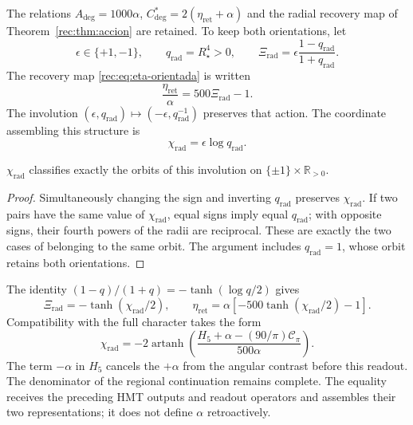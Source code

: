 The relations $A_{\deg}=1000\alpha$,
$C^*_{\deg}=2(\eta_{\mathrm{ret}}+\alpha)$ and the radial recovery map of
Theorem~\ref{rec:thm:accion} are retained. To keep both orientations, let
\begin{equation}
 \epsilon\in\{+1,-1\},\qquad
 q_{\mathrm{rad}}=R_\star^4>0,\qquad
 \Xi_{\mathrm{rad}}=
 \epsilon\frac{1-q_{\mathrm{rad}}}{1+q_{\mathrm{rad}}}.
 \label{md:restop:par-radial}
\end{equation}
The recovery map \eqref{rec:eq:eta-orientada} is written
\begin{equation}
 \frac{\eta_{\mathrm{ret}}}{\alpha}=500\Xi_{\mathrm{rad}}-1.
 \label{md:restop:recuperador}
\end{equation}
The involution
$(\epsilon,q_{\mathrm{rad}})
 \mapsto(-\epsilon,q_{\mathrm{rad}}^{-1})$
preserves that action. The coordinate assembling this structure is
\begin{equation}
 \boxed{\chi_{\mathrm{rad}}=\epsilon\log q_{\mathrm{rad}}.}
 \label{md:restop:chi}
\end{equation}

\begin{proposition}
\label{md:restop:proposicion-orbitas}
$\chi_{\mathrm{rad}}$ classifies exactly the orbits of this involution
on $\{\pm1\}\times\mathbb R_{>0}$.
\end{proposition}
\begin{proof}
Simultaneously changing the sign and inverting $q_{\mathrm{rad}}$ preserves
$\chi_{\mathrm{rad}}$. If two pairs have the same value of
$\chi_{\mathrm{rad}}$, equal signs imply equal
$q_{\mathrm{rad}}$; with opposite signs, their fourth powers of the radii are
reciprocal. These are exactly the two cases of belonging to the same
orbit. The argument includes $q_{\mathrm{rad}}=1$, whose orbit retains
both orientations.
\end{proof}

The identity
$(1-q)/(1+q)=-\tanh(\log q/2)$ gives
\begin{equation}
 \Xi_{\mathrm{rad}}
 =-\tanh(\chi_{\mathrm{rad}}/2),\qquad
 \boxed{\eta_{\mathrm{ret}}
 =\alpha[-500\tanh(\chi_{\mathrm{rad}}/2)-1].}
 \label{md:restop:accion-chi}
\end{equation}
Compatibility with the full character takes the form
\begin{equation}
 \boxed{\chi_{\mathrm{rad}}
 =-2\operatorname{artanh}
 \left(\frac{H_5+\alpha-(90/\pi)\mathcal C_\pi}{500\alpha}\right).}
 \label{md:restop:chi-caracter}
\end{equation}
The term $-\alpha$ in $H_5$ cancels the $+\alpha$ from the
angular contrast before this readout. The denominator of the
regional continuation remains complete. The equality receives the
preceding HMT outputs and readout operators and assembles their two representations;
it does not define $\alpha$ retroactively.


